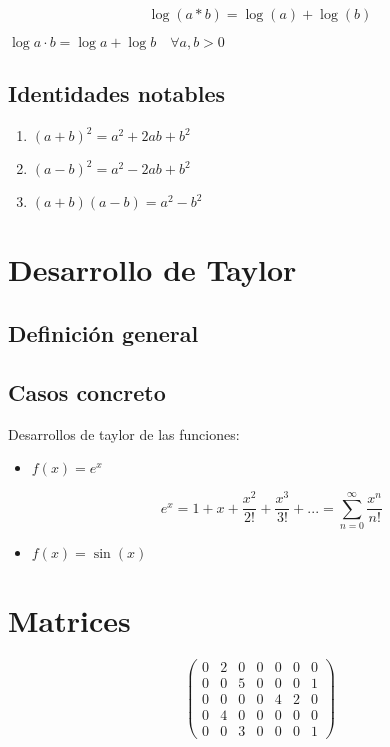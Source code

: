 \documentclass{article}
\begin{document}
\begin{equation}\log(a*b)=\log(a)+\log(b)\end{equation}

$\log a·b = \log a + \log b\quad \forall a,b > 0$\label{form_log}

\subsection{Identidades notables}

\begin{enumerate}
\item $ \left(a+b\right)^2 = a^2 + 2ab + b^2 $
\item $ \left(a-b\right)^2 = a^2 - 2ab + b^2 $
\item $ \left(a+b\right)\left(a-b\right) = a^2-b^2 $
\end{enumerate}

\section{Desarrollo de Taylor}

\subsection{Definición general}


\subsection{Casos concreto}

Desarrollos de taylor de las funciones:

\begin{itemize}
\item $f(x)=e^x$

\[ e^x = 1 + x + \frac{x^2}{2!} + \frac{x^3}{3!} + ... = \sum_{n=0}^\infty\frac{x^n}{n!}\]

\item $f(x) = \sin (x)$


\end{itemize}

\section{Matrices}
\[ \begin{pmatrix}
   0 & 2 & 0 & 0 & 0 & 0 & 0 \\
   0 & 0 & 5 & 0 & 0 & 0 & 1 \\
   0 & 0 & 0 & 0 & 4 & 2 & 0 \\
   0 & 4 & 0 & 0 & 0 & 0 & 0 \\
   0 & 0 & 3 & 0 & 0 & 0 & 1
\end{pmatrix} \]
\end{document}
